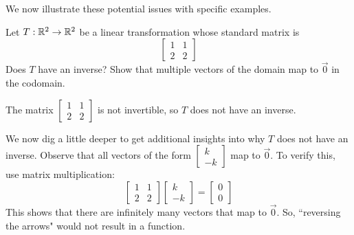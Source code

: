\documentclass{ximera}
\begin{document}
We now illustrate these potential issues with specific examples.
\begin{example}\label{ex:notonetoone} Let $T:\mathbb{R}^2\rightarrow \mathbb{R}^2$ be a linear transformation whose standard matrix is
$$\begin{bmatrix}1&1\\2&2\end{bmatrix}$$
Does $T$ have an inverse? Show that multiple vectors of the domain map to $\vec{0}$ in the codomain.  

\begin{explanation} The matrix $\begin{bmatrix}1&1\\2&2\end{bmatrix}$ is not invertible, so $T$ does not have an inverse.

We now dig a little deeper to get additional insights into why $T$ does not have an inverse.  Observe that all vectors of the form $\begin{bmatrix}k\\-k\end{bmatrix}$ map to $\vec{0}$.  To verify this, use matrix multiplication:
$$\begin{bmatrix}1&1\\2&2\end{bmatrix}\begin{bmatrix}k\\-k\end{bmatrix}=\begin{bmatrix}0\\0\end{bmatrix}$$
This shows that there are infinitely many vectors that map to $\vec{0}$.  So, ``reversing the arrows" would not result in a function.


\end{explanation}
\end{example}
\end{document}
